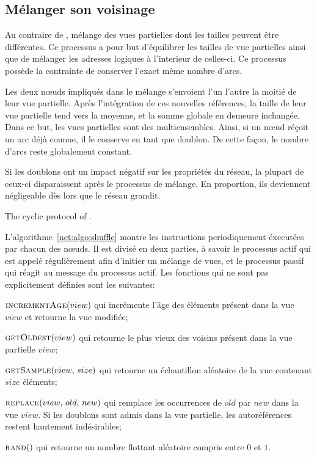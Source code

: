 
\subsection{Mélanger son voisinage}
\label{net:subsec:shuffling}

Au contraire de \CYCLON, \SPRAY mélange des vues partielles dont les tailles
peuvent être différentes. Ce processus a pour but d'équilibrer les tailles de
vue partielles ainsi que de mélanger les adresses logiques à l'interieur de
celles-ci.  Ce processus possède la contrainte de conserver l'exact même nombre
d'arcs.

Les deux nœuds impliqués dans le mélange s'envoient l'un l'autre la moitié de
leur vue partielle. Après l'intégration de ces nouvelles références, la taille
de leur vue partielle tend vers la moyenne, et la somme globale en demeure
inchangée. Dans ce but, les vues partielles sont des multiensembles. Ainsi, si
un nœud réçoit un arc déjà connue, il le conserve en tant que doublon.  De cette
façon, le nombre d'arcs reste globalement constant.

Si les doublons ont un impact négatif sur les propriétés du réseau, la plupart
de ceux-ci disparaissent après le processus de mélange. En proportion, ils
deviennent négligeable dès lors que le réseau grandit.

\begin{algorithm}[h]
  
  \caption{\label{net:algo:shuffle}The cyclic protocol of \SPRAY.}
\end{algorithm}

L'algorithme~\ref{net:algo:shuffle} montre les instructions periodiquement
éxecutées par chacun des nœuds. Il est divisé en deux parties, à savoir le
processus actif qui est appelé régulièrement afin d'initier un mélange de vues,
et le processus passif qui réagit au message du processus actif. Les fonctions
qui ne sont pas explicitement définies sont les suivantes:
\begin{inparaenum}[]
\item $\textsc{incrementAge}(view)$ qui incrémente l'âge des éléments présent
  dans la vue $view$ et retourne la vue modifiée;
\item $\textsc{getOldest}(view)$ qui retourne le plus vieux des voisins présent
  dans la vue partielle $view$;
\item $\textsc{getSample}(view,\, size)$ qui retourne un échantillon aléatoire
  de la vue contenant $size$ éléments;
\item $\textsc{replace}(view,\,old,\,new)$ qui remplace les occurrences de $old$
  par $new$ dans la vue $view$. Si les doublons sont admis dans la vue
  partielle, les autoréférences restent hautement indésirables;
\item $\textsc{rand}()$ qui retourne un nombre flottant aléatoire compris entre
  $0$ et $1$.
\end{inparaenum}


